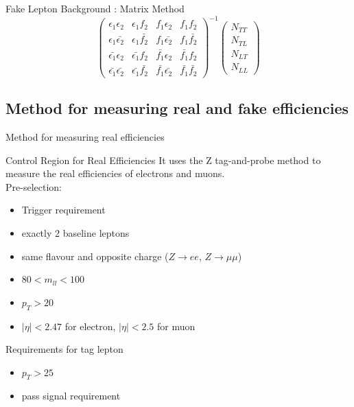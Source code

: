 \documentclass[mathserif,serif]{beamer}
\begin{document}
\begin{frame}{Fake Lepton Background : Matrix Method}
\begin{equation*}
\left( \begin{array}{cccc}
\epsilon_1 \epsilon_2 & \epsilon_1 f_2 & f_1 \epsilon_2 & f_1 f_2 \\
\epsilon_1 \bar{\epsilon_2} & \epsilon_1 \bar{f_2} & f_1 \bar{\epsilon_2} & f_1 \bar{f_2} \\
\bar{\epsilon_1} \epsilon_2 & \bar{\epsilon_1} f_2 & \bar{f_1} \epsilon_2 & \bar{f_1} f_2 \\
\bar{\epsilon_1} \bar{\epsilon_2} & \bar{\epsilon_1} \bar{f_2} & \bar{f_1} \bar{\epsilon_2} & \bar{f_1} \bar{f_2}
\end{array} \right)^{-1}
\left( \begin{array}{c}
N_{TT} \\
N_{TL} \\
N_{LT} \\
N_{LL}
\end{array} \right)
\end{equation*}
\end{frame}

\subsection{Method for measuring real and fake efficiencies}
\begin{frame}
\begin{center}
\huge
Method for measuring real efficiencies
\end{center}
\end{frame}

\begin{frame}{Control Region for Real Efficiencies}
It uses the Z tag-and-probe method to measure the real efficiencies of electrons and muons. \\
Pre-selection:
\begin{itemize}
\item Trigger requirement
\item exactly 2 baseline leptons
\item same flavour and opposite charge ($Z \rightarrow ee$, $Z \rightarrow \mu \mu$)
\item $80 < m_{ll} < 100$
\item $p_T > 20$
\item $|\eta| < 2.47$ for electron, $|\eta| < 2.5$ for muon
\end{itemize}
Requirements for tag lepton
\begin{itemize}
\item $p_T > 25$
\item pass signal requirement
\end{itemize}
\end{frame}
\end{document}
